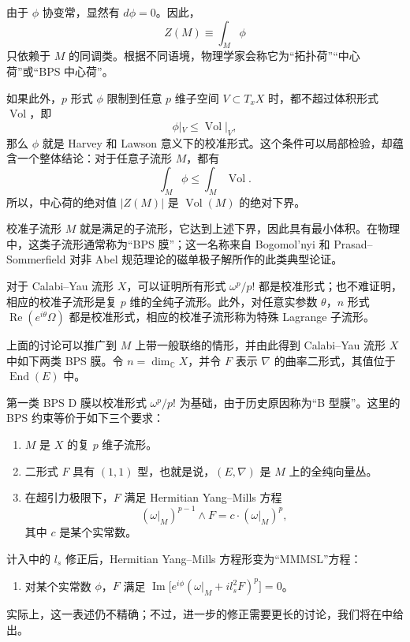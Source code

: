 由于 $\phi$ 协变常，显然有 $d\phi=0$。因此，
\[
Z(M)\equiv\int_M\phi
\]
只依赖于 $M$ 的同调类。根据不同语境，物理学家会称它为“拓扑荷”“中心荷”或“BPS 中心荷”。

如果此外，$p$ 形式 $\phi$ 限制到任意 $p$ 维子空间 $V\subset T_xX$ 时，都不超过体积形式 $\operatorname{Vol}$，即
\begin{equation}\label{eq:1.3}
\phi|_V\leq\operatorname{Vol}|_V,
\end{equation}
那么 $\phi$ 就是 Harvey 和 Lawson 意义下的校准形式。这个条件可以局部检验，却蕴含一个整体结论：对于任意子流形 $M$，都有
\begin{equation}\label{eq:1.4}
\int_M\phi\leq\int_M\operatorname{Vol}.
\end{equation}
所以，中心荷的绝对值 $|Z(M)|$ 是 $\operatorname{Vol}(M)$ 的绝对下界。

校准子流形 $M$ 就是满足的子流形，它达到上述下界，因此具有最小体积。在物理中，这类子流形通常称为“BPS 膜”；这一名称来自 Bogomol'nyi 和 Prasad--Sommerfield 对非 Abel 规范理论的磁单极子解所作的此类典型论证。

对于 Calabi--Yau 流形 $X$，可以证明所有形式 $\omega^p/p!$ 都是校准形式；也不难证明，相应的校准子流形是复 $p$ 维的全纯子流形。此外，对任意实参数 $\theta$，$n$ 形式 $\operatorname{Re}(e^{i\theta}\Omega)$ 都是校准形式，相应的校准子流形称为特殊 Lagrange 子流形。

上面的讨论可以推广到 $M$ 上带一般联络的情形，并由此得到 Calabi--Yau 流形 $X$ 中如下两类 BPS 膜。令 $n=\dim_{\mathbb{C}}X$，并令 $F$ 表示 $\nabla$ 的曲率二形式，其值位于 $\operatorname{End}(E)$ 中。

第一类 BPS D 膜以校准形式 $\omega^p/p!$ 为基础，由于历史原因称为“B 型膜”。这里的 BPS 约束等价于如下三个要求：
\begin{enumerate}[label=(\arabic*)]
\item $M$ 是 $X$ 的复 $p$ 维子流形。
\item 二形式 $F$ 具有 $(1,1)$ 型，也就是说，$(E,\nabla)$ 是 $M$ 上的全纯向量丛。
\item 在超引力极限下，$F$ 满足 Hermitian Yang--Mills 方程
\[
(\omega|_M)^{p-1}\wedge F=c\cdot(\omega|_M)^p,
\]
其中 $c$ 是某个实常数。
\end{enumerate}

计入中的 $l_s$ 修正后，Hermitian Yang--Mills 方程形变为“MMMSL”方程：
\begin{enumerate}[label={$(3')$}]
\item 对某个实常数 $\phi$，$F$ 满足 $\operatorname{Im}\bigl[e^{i\phi}(\omega|_M+il_s^2F)^p\bigr]=0$。
\end{enumerate}
实际上，这一表述仍不精确；不过，进一步的修正需要更长的讨论，我们将在中给出。

